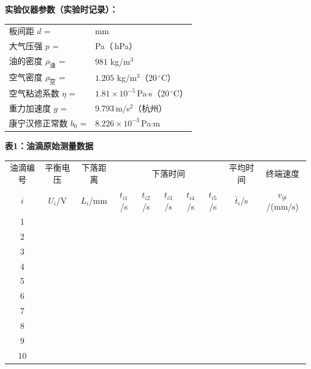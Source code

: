 \documentclass[a4paper,12pt]{article}
\begin{document}
\vspace{0.5cm}


\vspace{0.5cm}

{\fontsize{12pt}{18pt}\selectfont \textbf{实验仪器参数（实验时记录）：}}

\vspace{0.3cm}

{\fontsize{11pt}{16pt}\selectfont
\begin{tabular}{ll}
    板间距 $d$ = & \underline{\qquad\qquad} mm \\[0.5em]
    大气压强 $p$ = & \underline{\qquad\qquad} Pa（\underline{\qquad\qquad}\,hPa）\\[0.5em]
    油的密度 $\rho_{\text{油}}$ = & $981$ kg/m$^3$ \\[0.5em]
    空气密度 $\rho_{\text{空}}$ = & $1.205$ kg/m$^3$（20\,$^\circ$C）\\[0.5em]
    空气粘滤系数 $\eta$ = & $1.81 \times 10^{-5}$\,Pa$\cdot$s（20\,$^\circ$C）\\[0.5em]
    重力加速度 $g$ = & 9.793\,m/s$^2$（杭州）\\[0.5em]
    康宁汉修正常数 $b_0$ = & $8.226 \times 10^{-3}$\,Pa$\cdot$m \\
\end{tabular}
}

\vspace{0.8cm}

{\fontsize{12pt}{18pt}\selectfont \textbf{表1：油滴原始测量数据}}

\vspace{0.3cm}

{\fontsize{9.5pt}{13pt}\selectfont
\begin{tabular}{c|c|c|ccccc|c|c}
    \toprule
    油滴编号 & 平衡电压 & 下落距离 & \multicolumn{5}{c|}{下落时间} & 平均时间 & 终端速度 \\
    $i$ & $U_i$/V & $L_i$/mm & $t_{i1}$/s & $t_{i2}$/s & $t_{i3}$/s & $t_{i4}$/s & $t_{i5}$/s & $\bar{t}_i$/s & $v_{gi}$/(mm/s) \\
    \midrule
    1  & & & & & & & & & \\[0.6em]
    2  & & & & & & & & & \\[0.6em]
    3  & & & & & & & & & \\[0.6em]
    4  & & & & & & & & & \\[0.6em]
    5  & & & & & & & & & \\[0.6em]
    6  & & & & & & & & & \\[0.6em]
    7  & & & & & & & & & \\[0.6em]
    8  & & & & & & & & & \\[0.6em]
    9  & & & & & & & & & \\[0.6em]
    10 & & & & & & & & & \\[0.6em]
    \bottomrule
\end{tabular}
}
\end{document}
